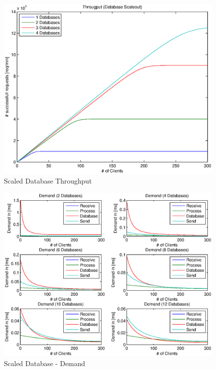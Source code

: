 \documentclass[a4paper]{article}
\begin{document}


\begin{figure}[H]
	\begin{center}
    \includegraphics[scale=0.6]{../plots-ms2-mg/dbscaleout-tp.eps}
  \end{center}
  \caption{Scaled Database Throughput}
  \label{fig:dbscaleout-tp}
\end{figure}




\begin{figure}[H]
	\begin{center}
    \includegraphics[scale=0.8]{../plots-ms2-mg/dbscaleout-demand-0.eps}
  \end{center}
  \caption{Scaled Database - Demand}
  \label{fig:dbscaleout-demand}
\end{figure}
\end{document}
